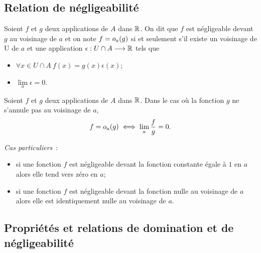 \subsection{Relation de négligeabilité}

\begin{defdef}
  Soient \(f\) et \(g\) deux applications de \(A\) dans \(\mathbb{R}\). On dit que \(f\) 
  est négligeable devant \(g\) au voisinage de \(a\) et on note 
  \(f=o\mathopen{}_{a}\left(g\right)\) si et seulement s'il existe un voisinage de U de \(a\) et 
  une application \(\epsilon : U\cap A \longrightarrow \mathbb{R}\) tels que
  \begin{itemize}
    \item \(\forall x \in U \cap A \ f(x)=g(x)\epsilon(x)\);
    \item \(\lim\limits_{a} \epsilon =0\).
  \end{itemize}
\end{defdef}
\begin{prop}
  Soient \(f\) et \(g\) deux applications de \(A\) dans \(\mathbb{R}\). Dans le cas où 
  la fonction \(g\) ne s'annule pas au voisinage de \(a\),
  \begin{equation}
    f=o\mathopen{}_{a}\left(g\right) \iff \lim\limits_{a} \frac{f}{g}=0.
  \end{equation}
\end{prop}

\emph{Cas particuliers}~:
\begin{itemize}
  \item si une fonction \(f\) est négligeable devant la fonction constante égale 
    à \(1\) en \(a\) alors elle tend vers zéro en \(a\);
  \item si une fonction \(f\) est négligeable devant la fonction nulle au 
    voisinage de \(a\) alors elle est identiquement nulle au voisinage de \(a\).
\end{itemize}

\subsection{Propriétés et relations de domination et de négligeabilité}


